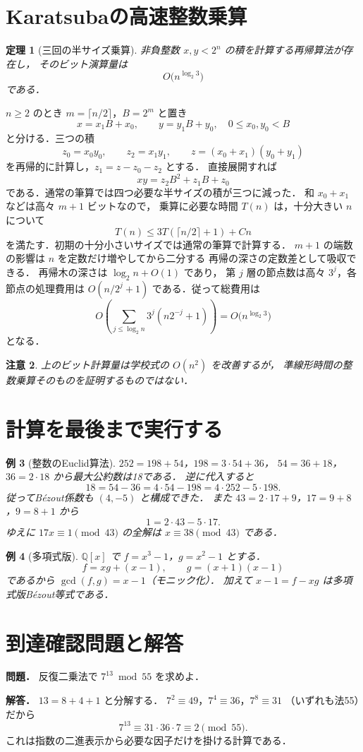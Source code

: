 \documentclass[a5paper,10pt,onecolumn]{jsarticle}
\makeatletter
\theoremstyle{mathnotetheorem}
\newtheorem{theorem}{定理}[section]
\newtheorem{example}[theorem]{例}
\newtheorem{remark}[theorem]{注意}
\renewcommand{\proofname}{証明}
\renewenvironment{proof}[1][\proofname]{%
  \par\pushQED{\qed}\normalfont\topsep4\p@\@plus2\p@\relax
  \trivlist\item[\hskip\labelsep\bfseries #1]\ignorespaces
}{\popQED\endtrivlist\@endpefalse}
\makeatother
\begin{document}
\section{Karatsubaの高速整数乗算}
\begin{theorem}[三回の半サイズ乗算]
非負整数 $x,y<2^n$ の積を計算する再帰算法が存在し，
そのビット演算量は
\[
 O\bigl(n^{\log_2 3}\bigr)
\]
である．
\end{theorem}
\begin{proof}
$n\ge2$ のとき $m=\lceil n/2\rceil$，$B=2^m$ と置き
\[
 x=x_1B+x_0,\qquad y=y_1B+y_0,
 \quad0\le x_0,y_0<B
\]
と分ける．三つの積
\[
 z_0=x_0y_0,\qquad z_2=x_1y_1,\qquad
 z=(x_0+x_1)(y_0+y_1)
\]
を再帰的に計算し，$z_1=z-z_0-z_2$ とする．
直接展開すれば
\[
 xy=z_2B^2+z_1B+z_0
\]
である．通常の筆算では四つ必要な半サイズの積が三つに減った．
和 $x_0+x_1$ などは高々 $m+1$ ビットなので，
乗算に必要な時間 $T(n)$ は，十分大きい $n$ について
\[
 T(n)\le3T(\lceil n/2\rceil+1)+Cn
\]
を満たす．初期の十分小さいサイズでは通常の筆算で計算する．
$m+1$ の端数の影響は $n$ を定数だけ増やしてから二分する
再帰の深さの定数差として吸収できる．
再帰木の深さは $\log_2n+O(1)$ であり，
第 $j$ 層の節点数は高々 $3^j$，各節点の処理費用は
$O(n/2^j+1)$ である．従って総費用は
\[
 O\!\left(\sum_{j\le\log_2n}3^j(n2^{-j}+1)\right)
 =O\bigl(n^{\log_2 3}\bigr)
\]
となる．
\end{proof}
\begin{remark}
上のビット計算量は学校式の $O(n^2)$ を改善するが，
準線形時間の整数乗算そのものを証明するものではない．
\end{remark}


\section{計算を最後まで実行する}
\begin{example}[整数のEuclid算法]
$252=198+54$，$198=3\cdot54+36$，
$54=36+18$，$36=2\cdot18$ から最大公約数は18である．
逆に代入すると
\[
18=54-36=4\cdot54-198=4\cdot252-5\cdot198.
\]
従ってB\'ezout係数も $(4,-5)$ と構成できた．
また $43=2\cdot17+9$，$17=9+8$，$9=8+1$ から
\[
1=2\cdot43-5\cdot17.
\]
ゆえに $17x\equiv1\pmod{43}$ の全解は
$x\equiv38\pmod{43}$ である．
\end{example}
\begin{example}[多項式版]
$\mathbb Q[x]$ で $f=x^3-1$，$g=x^2-1$ とする．
\[
 f=xg+(x-1),\qquad g=(x+1)(x-1)
\]
であるから $\gcd(f,g)=x-1$（モニック化）．
加えて $x-1=f-xg$ は多項式版B\'ezout等式である．
\end{example}
\section*{到達確認問題と解答}
\noindent\textbf{問題．}
反復二乗法で $7^{13}\bmod55$ を求めよ．

\medskip\noindent\textbf{解答．}
$13=8+4+1$ と分解する．
$7^2\equiv49$，$7^4\equiv36$，$7^8\equiv31$
（いずれも法55）だから
\[
 7^{13}\equiv31\cdot36\cdot7\equiv2\pmod{55}.
\]
これは指数の二進表示から必要な因子だけを掛ける計算である．
\end{document}
